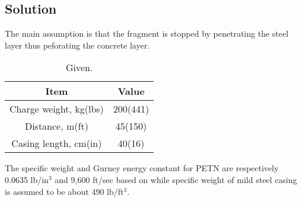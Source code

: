 \documentclass[]{article} %
\begin{document}
\subsection*{Solution}
The main assumption is that the fragment is stopped by penetrating the steel layer thus peforating the concrete layer. 

\begin{table}\centering\caption{Given.}\label{tab04}
\begin{tabular}{cc}
\toprule
Item&Value\\
\midrule
Charge weight, kg(lbs)&200(441)\\
\midrule
Distance, m(ft)&45(150)\\
\midrule
Casing length, cm(in)&40(16)\\
\bottomrule
\end{tabular}
\end{table}

The specific weight and Gurney energy constant for PETN are respectively 0.0635 lb/in$^3$ and 9,600 ft/sec based on \cite{ufc3340022014} while specific weight of mild steel casing is assumed to be about 490 lb/ft$^3$.
\end{document}
